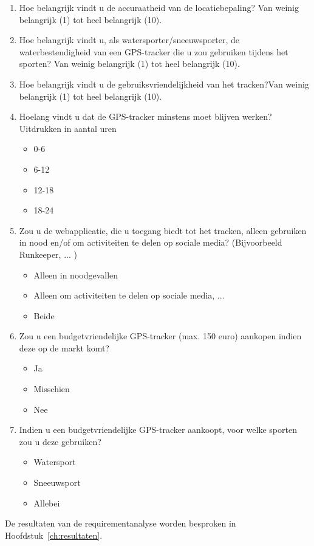 \begin{enumerate}
	\item Hoe belangrijk vindt u de accuraatheid van de locatiebepaling? Van weinig belangrijk (1) tot heel belangrijk (10).
	\item Hoe belangrijk vindt u, als watersporter/sneeuwsporter, de waterbestendigheid van een GPS-tracker die u zou gebruiken tijdens het sporten? Van weinig belangrijk (1) tot heel belangrijk (10).
	\item Hoe belangrijk vindt u de gebruiksvriendelijkheid van het tracken?Van weinig belangrijk (1) tot heel belangrijk (10).
	\item Hoelang vindt u dat de GPS-tracker minstens moet blijven werken? Uitdrukken in aantal uren
		\begin{itemize}
			\item 0-6
			\item 6-12
			\item 12-18
			\item 18-24
		\end{itemize}
	\item Zou u de webapplicatie, die u toegang biedt tot het tracken, alleen gebruiken in nood en/of om activiteiten te delen op sociale media? (Bijvoorbeeld Runkeeper, ... )
		\begin{itemize}
			\item Alleen in noodgevallen
			\item Alleen om activiteiten te delen op sociale media, ...
			\item Beide
		\end{itemize}
	\item  Zou u een budgetvriendelijke GPS-tracker (max. 150 euro) aankopen indien deze op de markt komt?
		\begin{itemize}
			\item Ja
			\item Misschien
			\item Nee
		\end{itemize}
	\item Indien u een budgetvriendelijke GPS-tracker aankoopt, voor welke sporten zou u deze gebruiken?
		\begin{itemize}
			\item Watersport
			\item Sneeuwsport
			\item Allebei
		\end{itemize}

\end{enumerate}
De resultaten van de requirementanalyse worden besproken in Hoofdstuk~\ref{ch:resultaten}.


